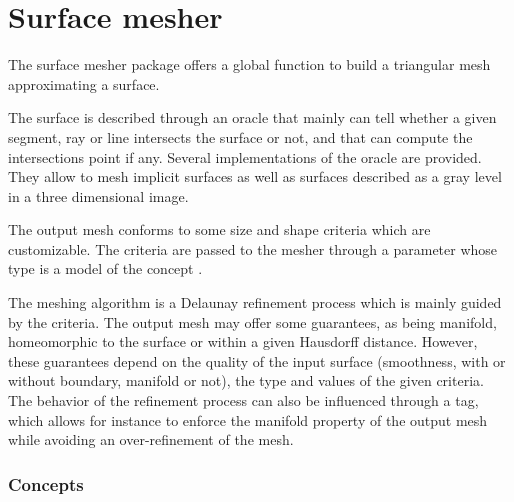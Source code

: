 \chapter{Surface mesher}


The surface mesher package offers a global function
to build a triangular mesh approximating a surface.

The surface is described through an oracle  that mainly can tell whether a
given segment, ray or line  intersects the surface or not, 
and that can compute the
intersections point if any. Several implementations of
the oracle are provided. They allow to mesh
implicit surfaces as well as  surfaces described as a gray level in a three
dimensional image.

The output mesh conforms to some size and shape criteria 
which are customizable. The criteria are passed to the mesher
through a parameter 
whose type is a model of the
concept .

The meshing algorithm is a Delaunay refinement process
which is mainly guided by the criteria. 
The output mesh may offer some guarantees, as being manifold,
homeomorphic to the surface or within a given
Hausdorff distance.  However, these guarantees depend 
on the quality of the input surface (smoothness, with or without
boundary, manifold or  not),
the type and values of the given criteria. 
The behavior of the refinement process can also be influenced through
a tag, which allows for instance to enforce the manifold property
of  the output mesh  while avoiding an over-refinement of the mesh.


\subsection*{Concepts}

\\
 \\
 \\
 \\
 \\
 \\


